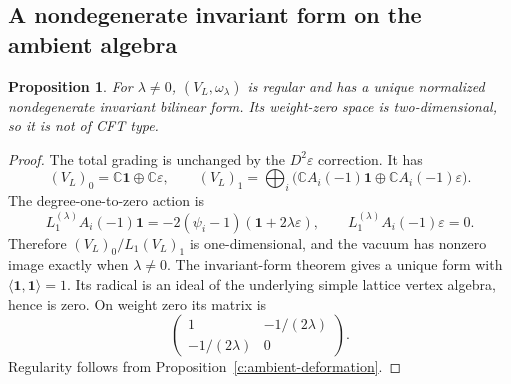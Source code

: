 \documentclass[11pt,a4paper]{article}
\numberwithin{equation}{section}
\newtheorem{proposition}[theorem]{Proposition}
\theoremstyle{definition}\newtheorem{definition}[theorem]{Definition}
\theoremstyle{remark}\newtheorem{remark}[theorem]{Remark}
\newcommand{\C}{\mathbb C}\newcommand{\Z}{\mathbb Z}\newcommand{\Q}{\mathbb Q}
\newcommand{\one}{\mathbf1}\newcommand{\B}{\mathcal B}\newcommand{\W}{W_N}
\begin{document}
\subsection*{A nondegenerate invariant form on the ambient algebra}
\begin{proposition}\label{c:screening-form}
For $\lambda\ne0$, $(V_L,\omega_\lambda)$ is regular and has a unique normalized nondegenerate invariant bilinear form. Its weight-zero space is two-dimensional, so it is not of CFT type.
\end{proposition}
\begin{proof}
The total grading is unchanged by the $D^2\varepsilon$ correction. It has
\[
 (V_L)_0=\C\one\oplus\C\varepsilon,\qquad
 (V_L)_1=\bigoplus_i\big(\C A_i(-1)\one\oplus\C A_i(-1)\varepsilon\big).
\]
The degree-one-to-zero action is
\[
 L_1^{(\lambda)}A_i(-1)\one
   =-2(\psi_i-1)(\one+2\lambda\varepsilon),\qquad
 L_1^{(\lambda)}A_i(-1)\varepsilon=0.
\]
Therefore $(V_L)_0/L_1(V_L)_1$ is one-dimensional, and the vacuum has nonzero image exactly when $\lambda\ne0$. The invariant-form theorem \cite{c:LiForm} gives a unique form with $\langle\one,\one\rangle=1$. Its radical is an ideal of the underlying simple lattice vertex algebra, hence is zero. On weight zero its matrix is
\[
 \begin{pmatrix}1&-1/(2\lambda)\\-1/(2\lambda)&0\end{pmatrix}.
\]
Regularity follows from Proposition~\ref{c:ambient-deformation}.
\end{proof}
\end{document}
